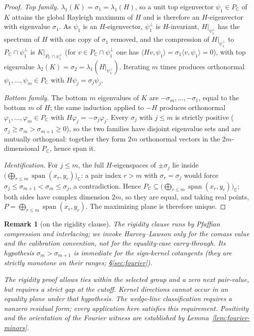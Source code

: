 \documentclass[11pt]{article}
\newtheorem{remark}[theorem]{Remark}
\newcommand{\C}{\mathbb{C}}
\begin{document}
\begin{proof}
\emph{Top family.} \(\lambda_1(K)=\sigma_1=\lambda_1(H)\), so a unit top
eigenvector \(\psi_1\in P_{\C}\) of \(K\) attains the global Rayleigh maximum
of \(H\) and is therefore an \(H\)-eigenvector with eigenvalue \(\sigma_1\).
As \(\psi_1\) is an \(H\)-eigenvector, \(\psi_1^\perp\) is \(H\)-invariant,
\(H|_{\psi_1^\perp}\) has the spectrum of \(H\) with one copy of \(\sigma_1\)
removed, and the compression of \(H|_{\psi_1^\perp}\) to
\(P_{\C}\cap\psi_1^\perp\) is \(K|_{P_{\C}\cap\psi_1^\perp}\) (for
\(v\in P_{\C}\cap\psi_1^\perp\) one has
\(\langle Hv,\psi_1\rangle=\sigma_1\langle v,\psi_1\rangle=0\)), with top
eigenvalue \(\lambda_2(K)=\sigma_2=\lambda_1(H|_{\psi_1^\perp})\). Iterating
\(m\) times produces orthonormal \(\psi_1,\dots,\psi_m\in P_{\C}\) with
\(H\psi_j=\sigma_j\psi_j\).

\emph{Bottom family.} The bottom \(m\) eigenvalues of \(K\) are
\(-\sigma_m,\dots,-\sigma_1\), equal to the bottom \(m\) of \(H\); the same
induction applied to \(-H\) produces orthonormal
\(\varphi_1,\dots,\varphi_m\in P_{\C}\) with \(H\varphi_j=-\sigma_j\varphi_j\).
Every \(\sigma_j\) with \(j\le m\) is strictly positive
(\(\sigma_j\ge\sigma_m>\sigma_{m+1}\ge0\)), so the two families have disjoint
eigenvalue sets and are mutually orthogonal: together they form \(2m\)
orthonormal vectors in the \(2m\)-dimensional \(P_{\C}\), hence span it.

\emph{Identification.} For \(j\le m\), the full \(H\)-eigenspaces of
\(\pm\sigma_j\) lie inside
\(\bigl(\bigoplus_{r\le m}\operatorname{span}(x_r,y_r)\bigr)_{\C}\): a pair
index \(r>m\) with \(\sigma_r=\sigma_j\) would force
\(\sigma_j\le\sigma_{m+1}<\sigma_m\le\sigma_j\), a contradiction. Hence
\(P_{\C}\subseteq\bigl(\bigoplus_{r\le m}\operatorname{span}(x_r,y_r)\bigr)_{\C}\);
both sides have complex dimension \(2m\), so they are equal, and taking real
points, \(P=\bigoplus_{r\le m}\operatorname{span}(x_r,y_r)\). The maximizing
plane is therefore unique.
\end{proof}

\begin{remark}[on the rigidity clause]
\label{rem:rigidity-clause}
The rigidity clause runs by Pfaffian compression and interlacing; we invoke
Harvey--Lawson only for the comass value and the calibration convention, not
for the equality-case carry-through. Its hypothesis \(\sigma_m>\sigma_{m+1}\)
is immediate for the sign-kernel cotangents (they are strictly monotone on
their ranges; \S\ref{sec:fourier}).

The rigidity proof allows ties within the selected group and a zero
next pair-value, but requires a strict gap at the cutoff. Kernel directions
cannot occur in an equality plane under that hypothesis. The wedge-line
classification requires a nonzero residual form; every application here
satisfies this requirement. Positivity and the orientation of the Fourier
witness are established by Lemma~\ref{lem:fourier-minors}.
\end{remark}
\end{document}
